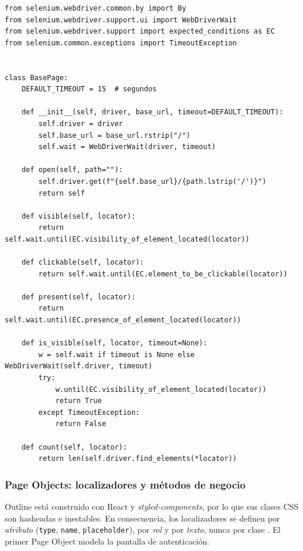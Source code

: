\documentclass[12pt]{article}
\begin{document}
\begin{lstlisting}[style=py,caption={\texttt{pages/base\_page.py} --- utilidades de espera explícita.},captionpos=b]
from selenium.webdriver.common.by import By
from selenium.webdriver.support.ui import WebDriverWait
from selenium.webdriver.support import expected_conditions as EC
from selenium.common.exceptions import TimeoutException


class BasePage:
    DEFAULT_TIMEOUT = 15  # segundos

    def __init__(self, driver, base_url, timeout=DEFAULT_TIMEOUT):
        self.driver = driver
        self.base_url = base_url.rstrip("/")
        self.wait = WebDriverWait(driver, timeout)

    def open(self, path=""):
        self.driver.get(f"{self.base_url}/{path.lstrip('/')}")
        return self

    def visible(self, locator):
        return self.wait.until(EC.visibility_of_element_located(locator))

    def clickable(self, locator):
        return self.wait.until(EC.element_to_be_clickable(locator))

    def present(self, locator):
        return self.wait.until(EC.presence_of_element_located(locator))

    def is_visible(self, locator, timeout=None):
        w = self.wait if timeout is None else WebDriverWait(self.driver, timeout)
        try:
            w.until(EC.visibility_of_element_located(locator))
            return True
        except TimeoutException:
            return False

    def count(self, locator):
        return len(self.driver.find_elements(*locator))
\end{lstlisting}

\subsubsection{Page Objects: localizadores y métodos de negocio}

Outline está construido con React y \textit{styled-components}, por lo que sus
clases CSS son hasheadas e inestables. En consecuencia, los localizadores se
definen por \emph{atributo} (\texttt{type}, \texttt{name}, \texttt{placeholder}),
por \emph{rol} y por \emph{texto}, nunca por clase \citep{seleniumdocs}. El
primer Page Object modela la pantalla de autenticación.
\end{document}
